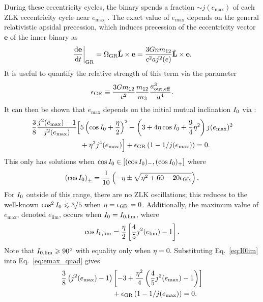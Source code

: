 \documentclass[
        fleqn,
        usenatbib,
    ]{mnras}
\newcommand*{\rd}[2]{\frac{\mathrm{d}#1}{\mathrm{d}#2}}
\newcommand*{\at}[1]{\left.#1\right|}
\newcommand*{\p}[1]{\left(#1\right)}
\newcommand*{\s}[1]{\left[#1\right]}
\newcommand*{\bm}[1]{\mathbf{#1}}
\newcommand*{\uv}[1]{\hat{\mathbf{#1}}}
\begin{document}
During these eccentricity cycles, the binary spends a fraction $\sim
j(e_{\max})$ of each ZLK eccentricity cycle near $e_{\max}$
\citep{anderson2016formation}. The exact value of $e_{\max}$ depends on the
general relativistic apsidal precession, which induces precession of the
eccentricity vector $\bm{e}$ of the inner binary as
\begin{equation}
    \at{\rd{\bm{e}}{t}}_{\rm GR} = \Omega_{\rm GR}\uv{L} \times \bm{e}
        = \frac{3Gnm_{12}}{c^2aj^2(e)}\uv{L} \times \bm{e}.
\end{equation}
It is useful to quantify the relative strength of this term via the parameter
\begin{equation}
    \epsilon_{\rm GR} \equiv \frac{3Gm_{12}}{c^2}
        \frac{m_{12}}{m_3}\frac{a_{\rm out, eff}^3}{a^4}.
\end{equation}
It can then be shown that $e_{\max}$ depends on the initial mutual inclination
$I_{\rm 0}$ via \citep{LML15, anderson2016formation}:
\begin{align}
    \frac{3}{8}\frac{j^2(e_{\max}) - 1}{j^2(e_{\max})}\Big[&
        5\p{\cos I_0 + \frac{\eta}{2}}^2
        - \p{3 + 4\eta \cos I_0 + \frac{9}{4}\eta^2}j(e_{\max})^2
            \nonumber\\
        &+ \eta^2 j^4(e_{\max})
    \Big] + \epsilon_{\rm GR}\p{1 - 1 / j(e_{\max})} = 0.\label{eq:emax_quad}
\end{align}
This only has solutions when $\cos I_{\rm 0} \in [(\cos I_{\rm 0})_-, (\cos
I_{\rm 0})_+]$ where \citep{anderson2016formation}
\begin{equation}
    \p{\cos I_{\rm 0}}_{\pm} = \frac{1}{10}\p{-\eta \pm \sqrt{\eta^2 + 60 -
        20\epsilon_{\rm GR}}}.\label{eq:I0bounds}
\end{equation}
For $I_{\rm 0}$ outside of this range, there are no ZLK oscillations; this
reduces to the well-known $\cos^2 I_{\rm 0} \leq 3/5$ when $\eta = \epsilon_{\rm
GR} = 0$. Additionally, the maximum value of $e_{\max}$, denoted $e_{\lim}$,
occurs when $I_{\rm 0} = I_{\rm 0, \lim}$, where
\begin{equation}
    \cos I_{\rm 0, \lim} = \frac{\eta}{2}\s{\frac{4}{5}j^2(e_{\lim}) -
        1}.\label{eq:I0lim}
\end{equation}
Note that $I_{\rm 0, \lim} \geq 90^\circ$ with equality only when $\eta
= 0$. Substituting Eq.~\eqref{eq:I0lim} into Eq.~\eqref{eq:emax_quad}
gives
\begin{align}
    \frac{3}{8}\p{j^2(e_{\max}) - 1}&\s{-3 + \frac{\eta^2}{4}
        \p{\frac{4}{5}j^2(e_{\max}) - 1}}\nonumber\\
        &+ \epsilon_{\rm GR}\p{1 - 1 / j(e_{\max})} = 0.
        \label{eq:def_elim}
\end{align}
\end{document}
